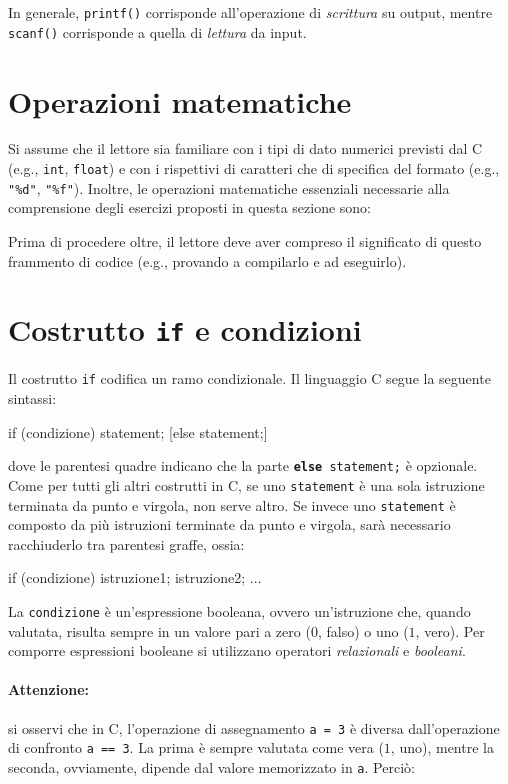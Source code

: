 \documentclass[oneside]{scrbook}
\begin{document}
In generale, \texttt{printf()} corrisponde all’operazione di \emph{scrittura} su
output, mentre \texttt{scanf()} corrisponde a quella di \emph{lettura} da input.



\section{Operazioni matematiche}
Si assume che il lettore sia familiare con i tipi di dato numerici previsti dal C (e.g., \texttt{int}, \texttt{float}) e con i rispettivi di caratteri che di specifica del formato (e.g., \verb|"%d"|, \verb|"%f"|). Inoltre, le operazioni matematiche essenziali necessarie alla comprensione degli esercizi proposti in questa sezione sono:



Prima di procedere oltre, il lettore deve aver compreso il significato di questo frammento di codice (e.g., provando a compilarlo e ad eseguirlo).

\section{Costrutto \texttt{if} e condizioni}

Il costrutto \texttt{if} codifica un ramo condizionale. Il linguaggio C segue la seguente sintassi:

\begin{clang}
  if (condizione)
    statement;
  [else statement;]
\end{clang}
dove le parentesi quadre indicano che la parte \texttt{\textbf{else} statement;} \`e opzionale. 
Come per tutti gli altri costrutti in C, se uno \texttt{statement} \`e una sola istruzione terminata da punto e virgola, non serve altro. Se invece uno \texttt{statement} \`e composto da pi\`u istruzioni terminate da punto e virgola, sar\`a necessario racchiuderlo tra parentesi graffe, ossia:

\begin{clang}
  if (condizione) {
    istruzione1;
    istruzione2;
    ...
  }
\end{clang}

La \texttt{condizione} \`e un'espressione booleana, ovvero un'istruzione che, quando valutata, risulta sempre in un valore pari a zero ($0$, falso) o uno ($1$, vero). Per comporre espressioni booleane si utilizzano operatori \emph{relazionali} e \emph{booleani}.

\paragraph{Attenzione:} si osservi che in C, l'operazione di assegnamento \texttt{a = 3} \`e diversa dall'operazione di confronto \texttt{a == 3}. La prima \`e sempre valutata come vera ($1$, uno), mentre la seconda, ovviamente, dipende dal valore memorizzato in \texttt{a}. Perci\`o:

\end{document}
